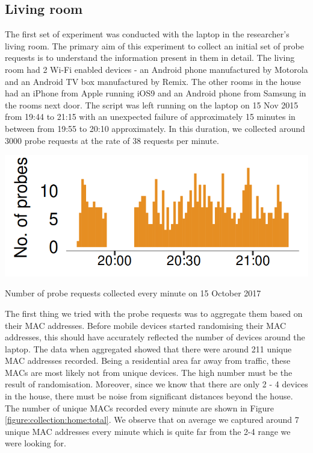 \subsection{Living room}
The first set of experiment was conducted with the laptop in the researcher's living room.
The primary aim of this experiment to collect an initial set of probe requests is to understand the information present in them in detail.
The living room had 2 Wi-Fi enabled devices - an Android phone manufactured by Motorola and an Android TV box manufactured by Remix.
The other rooms in the house had an iPhone from Apple running iOS9 and an Android phone from Samsung in the rooms next door.
The script was left running on the laptop on 15 Nov 2015 from 19:44 to 21:15 with an unexpected failure of approximately 15 minutes in between from 19:55 to 20:10 approximately.
In this duration, we collected around 3000 probe requests at the rate of 38 requests per minute.

\begin{marginfigure}
  \includegraphics{images/home-total-count.png}
  \caption{Number of probe requests collected every minute on 15 October 2017}
  \label{figure:collection:home:total}
\end{marginfigure}

The first thing we tried with the probe requests was to aggregate them based on their MAC addresses.
Before mobile devices started randomising their MAC addresses, this should have accurately reflected the number of devices around the laptop.
The data when aggregated showed that there were around 211 unique MAC addresses recorded.
Being a residential area far away from traffic, these MACs are most likely not from unique devices.
The high number must be the result of randomisation.
Moreover, since we know that there are only 2 - 4 devices in the house, there must be noise from significant distances beyond the house.
The number of unique MACs recorded every minute are shown in Figure \ref{figure:collection:home:total}.
We observe that on average we captured around 7 unique MAC addresses every minute which is quite far from the 2-4 range we were looking for.

